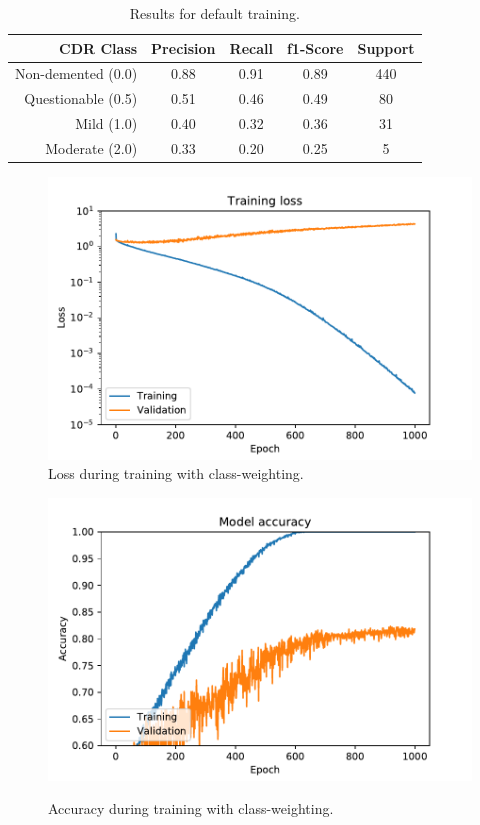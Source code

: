 \documentclass{kththesis}
\begin{document}
\begin{table}[H]
  \begin{center}
    \caption{Results for default training. \label{tab:results_class_weighted}}
    \begin{tabular}{r|ccc|c}
      \textbf{CDR Class} & \textbf{Precision} & \textbf{Recall} & \textbf{f1-Score} & \textbf{Support} \\
      \toprule
      Non-demented (0.0) & 0.88 & 0.91 & 0.89 & 440 \\
      Questionable (0.5) & 0.51 & 0.46 & 0.49 & 80  \\
      Mild (1.0)         & 0.40 & 0.32 & 0.36 & 31  \\
      Moderate (2.0)     & 0.33 & 0.20 & 0.25 & 5   \\
    \end{tabular}
  \end{center}
\end{table}
\begin{figure}
  \centering
  \includegraphics[width=0.9\linewidth]{img/loss_class_weighted.pdf}
  \caption{Loss during training with class-weighting.}
  \label{fig:loss_default}
  \vspace{-30mm}
\end{figure}
\begin{figure}
  \centering
  \includegraphics[width=0.9\linewidth]{img/accuracy_class_weighted.pdf}
  \label{fig:accuracy_default}
  \caption{Accuracy during training with class-weighting.}
\end{figure}
\end{document}

